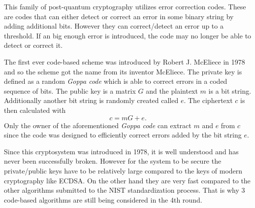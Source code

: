 This family of post-quantum cryptography utilizes error correction codes. These are codes that can either detect or correct an error in some binary string by adding additional bits. However they can correct/detect an error up to a threshold. If an big enough error is introduced, the code may no longer be able to detect or correct it.  

The first ever code-based scheme was introduced by Robert J. McEliece in 1978 and so the scheme got the name from its inventor McEliece. The private key is defined as a random \textit{Goppa code} which is able to correct errors in a coded sequence of bits. The public key is a matrix $G$ and the plaintext $m$ is a bit string. Additionally another bit string is randomly created called $e$. The ciphertext $c$ is then calculated with
\begin{equation}
  c=mG+e.
\end{equation}
Only the owner of the aforementioned \textit{Goppa code} can extract $m$ and $e$ from $c$ since the code was designed to efficiently correct errors added by the bit string $e$. \cite{Bernstein149}

Since this cryptosystem was introduced in 1978, it is well understood and has never been successfully broken. However for the system to be secure the private/public keys have to be relatively large compared to the keys of modern cryptography like ECDSA. On the other hand they are very fast compared to the other algorithms submitted to the NIST standardization process. That is why 3 code-based algorithms are still being considered in the 4th round. \cite{Chen2016}
